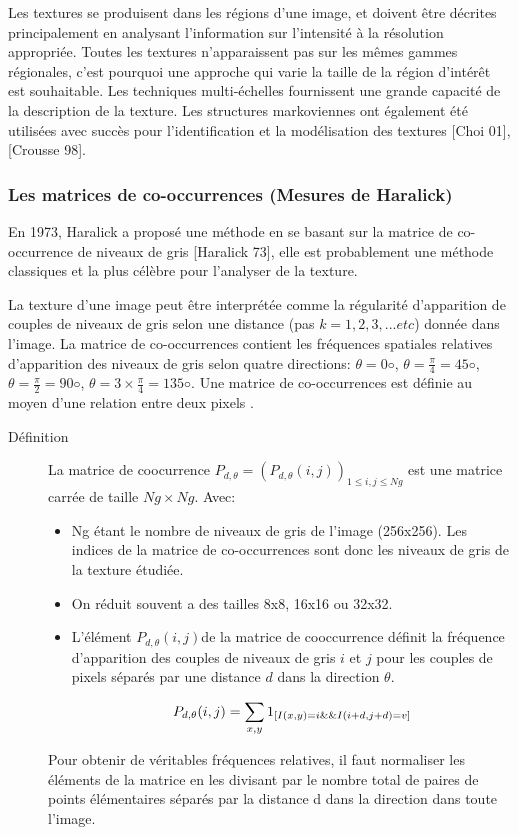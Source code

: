 Les textures se produisent dans les régions d'une image, et doivent être décrites principalement en analysant l'information sur l'intensité à la résolution appropriée. Toutes les textures n'apparaissent pas sur les mêmes gammes régionales, c'est pourquoi une approche qui varie la taille de la région d'intérêt est souhaitable. Les techniques multi-échelles fournissent une grande capacité de la description de la texture. Les structures markoviennes ont également été utilisées avec succès pour l'identification et la modélisation des textures [Choi 01], [Crousse 98].


\subsubsection{Les matrices de co-occurrences (Mesures de Haralick)}
 En 1973, Haralick a proposé une méthode en se basant sur la matrice de co-occurrence de niveaux de gris [Haralick 73], elle est probablement une méthode classiques et la plus célèbre pour l'analyser de la texture.
 
 La texture d'une image peut être interprétée comme la régularité d’apparition de couples de niveaux de gris selon une distance (pas $k=1, 2, 3, ...etc$) donnée dans l’image. La matrice de co-occurrences contient les fréquences spatiales relatives d’apparition des niveaux
 de gris selon quatre directions: $\theta = 0◦$,  $\theta =  \frac{\pi}{4} = 45◦$,  $\theta =  \frac{\pi}{2} = 90◦$,  $\theta =  3 \times \frac{\pi}{4} = 135◦$. Une matrice de co-occurrences est définie au moyen d’une relation entre deux pixels .\\

\begin{description}
	\item[Définition] La matrice de coocurrence $P_{d,\theta}=(P_{d,\theta}(i, j))_{1\leq i,j \leq Ng}$ est une matrice carrée de taille $Ng \times Ng$. Avec:
	\begin{itemize}
		\item Ng étant le nombre de niveaux de gris de l'image (256x256). Les indices de la matrice de co-occurrences sont
		donc les niveaux de gris de la texture étudiée.
		\item On réduit souvent a des tailles 8x8, 16x16 ou 32x32.
		\item L’élément $P_{d,\theta}(i, j)$de la matrice de cooccurrence définit la fréquence d'apparition des couples de niveaux de gris $i$ et $j$ pour les couples de pixels séparés par une distance $d$ dans la direction $\theta$.
		
		\begin{equation}
			P_{d,\theta}(i, j) = \sum_{x,y} 1_{ [I(x, y) = i \space \&\& \space  I(i + d, j + d) = v ]}
		\end{equation}
	\end{itemize} 
Pour obtenir de véritables fréquences relatives, il faut normaliser les éléments de la matrice en les divisant par le nombre total de paires de points élémentaires séparés par la distance d dans la direction dans toute l’image.
\end{description}

